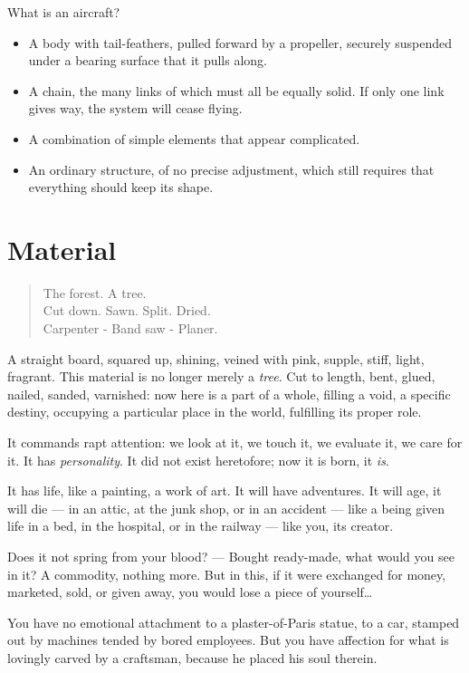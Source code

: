 \documentclass{book}
\begin{document}
What is an aircraft?

\begin{itemize}
\item
  A body with tail-feathers, pulled forward by a propeller, securely
  suspended under a bearing surface that it pulls along.
\item
  A chain, the many links of which must all be equally solid. If only
  one link gives way, the system will cease flying.
\item
  A combination of simple elements that appear complicated.
\item
  An ordinary structure, of no precise adjustment, which still
  requires that everything should keep its shape.
\end{itemize}

\section{Material}

\begin{verse}
  The forest. A tree.\\
  Cut down. Sawn. Split. Dried.\\
  Carpenter - Band saw - Planer.
\end{verse}

A straight board, squared up, shining, veined with pink, supple,
stiff, light, fragrant. This material is no longer merely a
\emph{tree}.  Cut to length, bent, glued, nailed, sanded, varnished:
now here is a part of a whole, filling a void, a specific destiny,
occupying a particular place in the world, fulfilling its proper role.

It commands rapt attention: we look at it, we touch it, we evaluate
it, we care for it. It has \textit{personality}. It did not exist
heretofore; now it is born, it \textit{is}.

It has life, like a painting, a work of art. It will have adventures.
It will age, it will die --- in an attic, at the junk shop, or in an
accident --- like a being given life in a bed, in the hospital, or in
the railway --- like you, its creator.

Does it not spring from your blood? --- Bought ready-made, what would
you see in it?  A commodity, nothing more.  But in this, if it were
exchanged for money, marketed, sold, or given away, you would lose a
piece of yourself\ldots

You have no emotional attachment to a plaster-of-Paris statue, to a
car, stamped out by machines tended by bored employees. But you have
affection for what is lovingly carved by a craftsman, because he
placed his soul therein.
\end{document}
